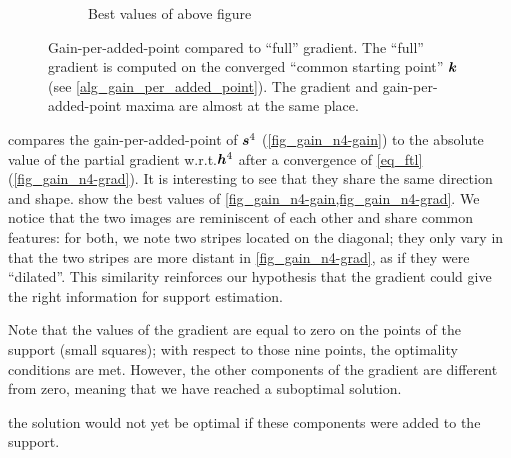 \begin{figure}[!ht]
\begin{subfigure}[b]{0.34\linewidth}
	\caption{Best values of above figure}\label{fig_gain_n4-grad_best}
	\end{subfigure}
\caption{Gain-per-added-point compared to “full” gradient. The “full” gradient is computed on the converged “common starting point” $\bm{k}$ (see \cref{alg_gain_per_added_point}). The gradient and gain-per-added-point maxima are almost at the same place. }\label{fig_gain_n4}
\end{figure}

\noindent
{} compares the gain-per-added-point of $\bm{s}^4$ (\cref{fig_gain_n4-gain}) to the absolute value of the partial gradient w.r.t.\@ $\bm{h}^4$ after a convergence of \eqref{eq_ftl} (\cref{fig_gain_n4-grad}). It is interesting to see that they share the same direction and shape.  show the best values of \cref{fig_gain_n4-gain,fig_gain_n4-grad}. We notice that the two images are reminiscent of each other and share common features: for both, we note two stripes located on the  diagonal; they only vary in that the two stripes are more distant in \cref{fig_gain_n4-grad}, as if they were “dilated”. This similarity reinforces our hypothesis that the gradient could give the right information for support estimation.

\noindent
Note that the values of the gradient are equal to zero on the points of the support (small squares); with respect to those nine points, the optimality conditions are met. However, the other components of the gradient are different from zero, meaning that we have reached a suboptimal solution.

the solution would not yet be optimal if these components were added to the support.

